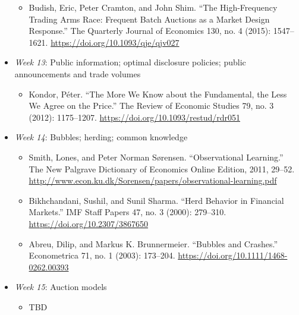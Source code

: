 \documentclass{article}
\begin{document}
\begin{itemize}
\begin{itemize}
		\item Budish, Eric, Peter Cramton, and John Shim. “The High-Frequency Trading Arms Race: Frequent Batch Auctions as a Market Design Response.” The Quarterly Journal of Economics 130, no. 4 (2015): 1547–1621. \url{https://doi.org/10.1093/qje/qjv027}
	\end{itemize}
	\item \textit{Week 13}: Public information; optimal disclosure policies; public announcements and trade volumes
	\begin{itemize}
		\item Kondor, Péter. “The More We Know about the Fundamental, the Less We Agree on the Price.” The Review of Economic Studies 79, no. 3 (2012): 1175–1207. \url{https://doi.org/10.1093/restud/rdr051}
	\end{itemize}
	\item \textit{Week 14}: Bubbles; herding; common knowledge
	\begin{itemize}
		\item Smith, Lones, and Peter Norman Sørensen. “Observational Learning.” The New Palgrave Dictionary of Economics Online Edition, 2011, 29–52. \url{http://www.econ.ku.dk/Sorensen/papers/observational-learning.pdf}
		\item Bikhchandani, Sushil, and Sunil Sharma. “Herd Behavior in Financial Markets.” IMF Staff Papers 47, no. 3 (2000): 279–310. \url{https://doi.org/10.2307/3867650}
		\item Abreu, Dilip, and Markus K. Brunnermeier. “Bubbles and Crashes.” Econometrica 71, no. 1 (2003): 173–204. \url{https://doi.org/10.1111/1468-0262.00393}
	\end{itemize}
	\item \textit{Week 15}: Auction models
	\begin{itemize}
		\item TBD
	\end{itemize}
\end{itemize}



\end{document}
